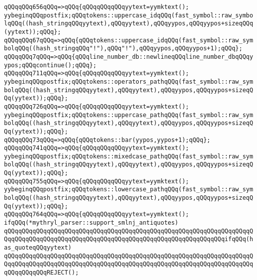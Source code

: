 \verb|qQQqqQQq656qQQq=>qQQq{qQQqqQQqqQQqyytext=yymktext();|\newline
\verb|yybeginqQQqpostfix;qQQqtokens::uppercase_idqQQq(fast_symbol::raw_symbolqQQq((hash_stringqQQqyytext),qQQqyytext),qQQqyypos,qQQqyypos+sizeqQQq(yytext));qQQq};|\newline
\verb|qQQqqQQq67qQQq=>qQQq{qQQqtokens::uppercase_idqQQq(fast_symbol::raw_symbolqQQq((hash_stringqQQq"!"),qQQq"!"),qQQqyypos,qQQqyypos+1);qQQq};|\newline
\verb|qQQqqQQq7qQQq=>qQQq{qQQqline_number_db::newlineqQQqline_number_dbqQQqyypos;qQQqcontinue();qQQq};|\newline
\verb|qQQqqQQq711qQQq=>qQQq{qQQqqQQqqQQqyytext=yymktext();|\newline
\verb|yybeginqQQqpostfix;qQQqtokens::operators_pathqQQq(fast_symbol::raw_symbolqQQq((hash_stringqQQqyytext),qQQqyytext),qQQqyypos,qQQqyypos+sizeqQQq(yytext));qQQq};|\newline
\verb|qQQqqQQq726qQQq=>qQQq{qQQqqQQqqQQqyytext=yymktext();|\newline
\verb|yybeginqQQqpostfix;qQQqtokens::uppercase_pathqQQq(fast_symbol::raw_symbolqQQq((hash_stringqQQqyytext),qQQqyytext),qQQqyypos,qQQqyypos+sizeqQQq(yytext));qQQq};|\newline
\verb|qQQqqQQq73qQQq=>qQQq{qQQqtokens::bar(yypos,yypos+1);qQQq};|\newline
\verb|qQQqqQQq741qQQq=>qQQq{qQQqqQQqqQQqyytext=yymktext();|\newline
\verb|yybeginqQQqpostfix;qQQqtokens::mixedcase_pathqQQq(fast_symbol::raw_symbolqQQq((hash_stringqQQqyytext),qQQqyytext),qQQqyypos,qQQqyypos+sizeqQQq(yytext));qQQq};|\newline
\verb|qQQqqQQq755qQQq=>qQQq{qQQqqQQqqQQqyytext=yymktext();|\newline
\verb|yybeginqQQqpostfix;qQQqtokens::lowercase_pathqQQq(fast_symbol::raw_symbolqQQq((hash_stringqQQqyytext),qQQqyytext),qQQqyypos,qQQqyypos+sizeqQQq(yytext));qQQq};|\newline
\verb|qQQqqQQq764qQQq=>qQQq{qQQqqQQqqQQqyytext=yymktext();|\newline
\verb|ifqQQq(*mythryl_parser::support_smlnj_antiquotes)|\newline
\verb|qQQqqQQqqQQqqQQqqQQqqQQqqQQqqQQqqQQqqQQqqQQqqQQqqQQqqQQqqQQqqQQqqQQqqQQqqQQqqQQqqQQqqQQqqQQqqQQqqQQqqQQqqQQqqQQqqQQqqQQqqQQqqQQqqQQqifqQQq(has_quoteqQQqyytext)|\newline
\verb|qQQqqQQqqQQqqQQqqQQqqQQqqQQqqQQqqQQqqQQqqQQqqQQqqQQqqQQqqQQqqQQqqQQqqQQqqQQqqQQqqQQqqQQqqQQqqQQqqQQqqQQqqQQqqQQqqQQqqQQqqQQqqQQqqQQqqQQqqQQqqQQqqQQqqQQqREJECT();|\newline
